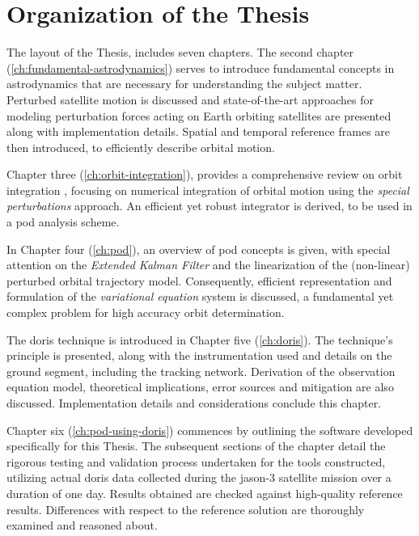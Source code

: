 \section{Organization of the Thesis}\label{ssec:organization}
The layout of the Thesis, includes seven chapters.
The second chapter (\autoref{ch:fundamental-astrodynamics}) serves to introduce
fundamental concepts in astrodynamics that are necessary for understanding the subject
matter.
Perturbed satellite motion is discussed and
state-of-the-art approaches for modeling perturbation forces acting on Earth orbiting
satellites are presented along with implementation details. Spatial and temporal reference
frames are then introduced, to efficiently describe orbital motion.

Chapter three (\autoref{ch:orbit-integration}), provides a comprehensive review on orbit integration
, focusing on
numerical integration of orbital motion using the \emph{special perturbations}
approach. An efficient yet robust integrator is derived, to be used in a \gls{pod}
analysis scheme.

In Chapter four (\autoref{ch:pod}), an overview of \gls{pod} concepts is given,
with special attention on the \emph{Extended Kalman Filter} and the linearization
of the (non-linear) perturbed orbital trajectory model. Consequently, efficient
representation and formulation of the \emph{variational equation} system is discussed,
a fundamental yet complex problem for high accuracy orbit determination.

The \gls{doris} technique is introduced in Chapter five (\autoref{ch:doris}).
The technique's principle is presented, along with the instrumentation used and
details on the ground segment, including the tracking network. Derivation of the
observation equation model, theoretical implications, error sources and mitigation are
also discussed. Implementation details and considerations conclude this
chapter.

Chapter six (\autoref{ch:pod-using-doris}) commences by outlining the software developed
specifically for this Thesis. The subsequent sections of the chapter detail the rigorous
testing and validation process undertaken for the tools constructed, utilizing actual \gls{doris}
 data collected during the \gls{jason}-3 satellite mission over a duration of one day.
Results obtained are checked against high-quality
reference results. Differences with respect to the reference solution are thoroughly
examined and reasoned about.

